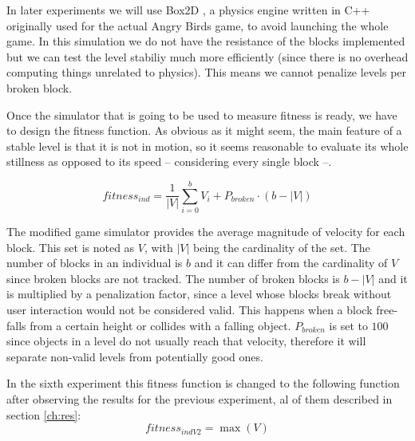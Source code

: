 \documentclass[runningheads,a4paper]{llncs}
\begin{document}
In later experiments we will use Box2D \cite{box2d}, a physics engine written in C++ originally
used for the actual Angry Birds game, to avoid launching the whole game. In this 
simulation we do not have the resistance of the blocks implemented but we can test
the level stabiliy much more efficiently (since there is no overhead computing things
unrelated to physics). This means we cannot penalize levels per broken block.


Once the simulator that is going to be used to measure fitness is
ready, we have to design the fitness function. As obvious as it
might seem, the main feature of a stable level is that it 
is not in motion, so it seems reasonable to evaluate its whole stillness
as opposed to its speed -- considering every single block --.

$$fitness_{ind} = \frac{1}{|V|}\sum_{i=0}^{b}{V_i} + P_{broken}\cdot(b-|V|)$$

The modified 
game simulator provides the average magnitude of
velocity for each block. %
This set is noted as $V$, with $|V|$ being the cardinality of the set. The number of blocks in an individual is $b$ and it can differ from the cardinality of $V$ since broken blocks are not tracked. The number of broken blocks is $b-|V|$ and it is multiplied by a penalization factor, since a level whose blocks break without user interaction would not be considered valid. This happens when a block free-falls from a certain height or collides with a falling object. 
$P_{broken}$ is set to $100$ since objects in a level do not usually reach that 
velocity, therefore it will separate non-valid levels from potentially good 
ones.

In the sixth experiment this fitness function is changed to the following function after observing the results for the previous experiment, al of them described in section \ref{ch:res}:
$$fitness_{indV2} = \max{(V)}$$
\end{document}
